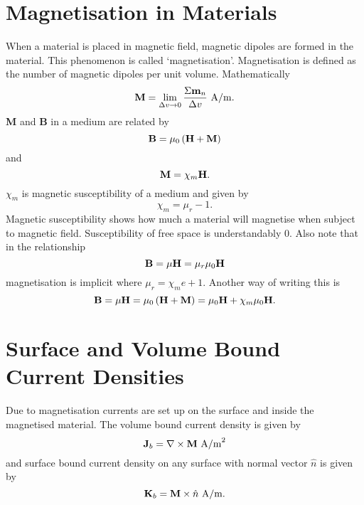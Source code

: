 \documentclass[12pt,a4paper]{article}
\begin{document}
\section{Magnetisation in Materials}
When a material is placed in magnetic field, magnetic dipoles are formed in the material. This phenomenon is called `magnetisation'. Magnetisation is defined as the number of magnetic dipoles per unit volume. Mathematically
\begin{equation}
\mathrm{\textbf M}=\lim_{\Delta v \to 0}\dfrac{\Sigma\mathrm{\textbf m}_n}{\Delta v}~\mathrm{A/m}.
\end{equation}
\textbf{M} and \textbf{B} in a medium are related by
\begin{equation}
\mathrm{\textbf B}=\mu_0\left(\mathrm{\textbf H}+\mathrm{\textbf M}\right)
\end{equation}
and
\begin{equation}
\mathrm{\textbf M}=\chi_m\mathrm{\textbf H}.
\end{equation}
$\chi_m$ is magnetic susceptibility of a medium and given by
\begin{equation}
\chi_m=\mu_r-1.
\end{equation}
Magnetic susceptibility shows how much a material will magnetise when subject to magnetic field. Susceptibility of free space is understandably 0. Also note that in the relationship
\begin{equation}
\mathrm{\textbf B}=\mu\mathrm{\textbf H}=\mu_r\mu_0\mathrm{\textbf H}
\end{equation}
magnetisation is implicit where $\mu_r=\chi_me+1$. Another way of writing this is
\begin{equation}
\mathrm{\textbf B}=\mu\mathrm{\textbf H}=\mu_0\left(\mathrm{\textbf H}+\mathrm{\textbf M}\right)=\mu_0\mathrm{\textbf H}+\chi_m\mu_0\mathrm{\textbf H}.
\end{equation}
\section{Surface and Volume Bound Current Densities}
Due to magnetisation currents are set up on the surface and inside the magnetised material. The volume bound current density is given by
\begin{equation}
\mathrm{\textbf J}_b=\nabla\times\mathrm{\textbf M}~\mathrm{A/m}^2
\end{equation}
and surface bound current density on any surface with normal vector $\hat n$ is given by
\begin{equation}
\mathrm{\textbf K}_b=\mathrm{\textbf M}\times\hat n~\mathrm{A/m}.
\end{equation}
\end{document}
